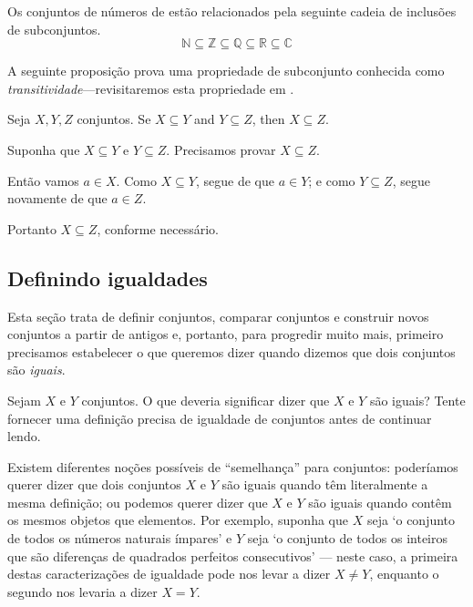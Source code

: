 \begin{example}
Os conjuntos de números de  estão relacionados pela seguinte cadeia de inclusões de subconjuntos.
\[ \mathbb{N} \subseteq \mathbb{Z} \subseteq \mathbb{Q} \subseteq \mathbb{R} \subseteq \mathbb{C} \]
\end{example}

A seguinte proposição prova uma propriedade de subconjunto conhecida como \textit{transitividade}---revisitaremos esta propriedade em .

\begin{proposition}
\label{propSubsetTransitive}
Seja $X,Y,Z$ conjuntos. Se $X \subseteq Y$ and $Y \subseteq Z$, then $X \subseteq Z$.
\end{proposition}

\begin{cproof}
Suponha que $X \subseteq Y$ e $Y \subseteq Z$. Precisamos provar $X \subseteq Z$.

Então vamos $a \in X$. Como $X \subseteq Y$, segue de  que $a \in Y$; e como $Y \subseteq Z$, segue novamente de  que $a \in Z$.

Portanto $X \subseteq Z$, conforme necessário.
\end{cproof}

\subsection*{Definindo igualdades}

Esta seção trata de definir conjuntos, comparar conjuntos e construir novos conjuntos a partir de antigos e, portanto, para progredir muito mais, primeiro precisamos estabelecer o que queremos dizer quando dizemos que dois conjuntos são \textit{iguais}.

\begin{discussion}
\label{dscSetEquality}
Sejam $X$ e $Y$ conjuntos. O que deveria significar dizer que $X$ e $Y$ são iguais? Tente fornecer uma definição precisa de igualdade de conjuntos antes de continuar lendo.
\end{discussion}

Existem diferentes noções possíveis de “semelhança” para conjuntos: poderíamos querer dizer que dois conjuntos $X$ e $Y$ são iguais quando têm literalmente a mesma definição; ou podemos querer dizer que $X$ e $Y$ são iguais quando contêm os mesmos objetos que elementos. Por exemplo, suponha que $X$ seja `o conjunto de todos os números naturais ímpares' e $Y$ seja `o conjunto de todos os inteiros que são diferenças de quadrados perfeitos consecutivos' --- neste caso, a primeira destas caracterizações de igualdade pode nos levar a dizer $X \ne Y$, enquanto o segundo nos levaria a dizer $X = Y$.

